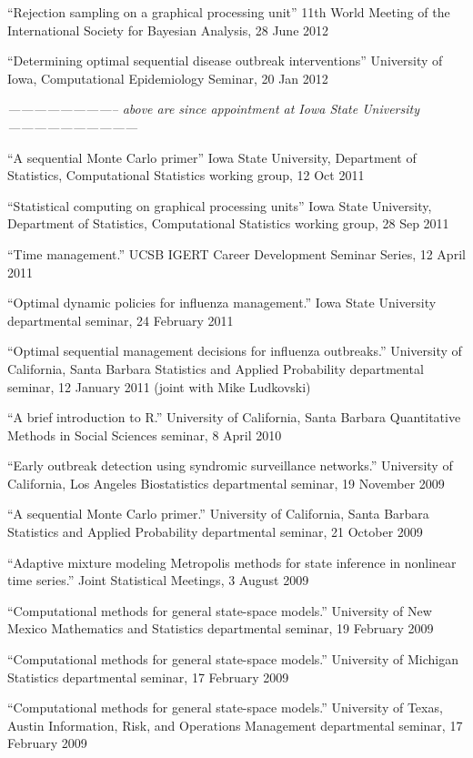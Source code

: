 \documentclass[overlapped,line]{res}
\newcommand{\sinceappt}{\emph{-------------------------- above are since appointment at Iowa State University ------------------------------}}
\newcommand{\sinceappt}{}
\begin{document}
\begin{resume}
{``Rejection sampling on a graphical processing unit'' 11th World Meeting of the International Society for Bayesian Analysis, 28 June 2012 

``Determining optimal sequential disease outbreak interventions'' University of Iowa, Computational Epidemiology Seminar, 20 Jan 2012 

\sinceappt

``A sequential Monte Carlo primer'' Iowa State University, Department of Statistics, Computational Statistics working group, 12 Oct 2011 

``Statistical computing on graphical processing units'' Iowa State University, Department of Statistics, Computational Statistics working group, 28 Sep 2011 

``Time management.'' UCSB IGERT Career Development Seminar Series, 12 April 2011 

``Optimal dynamic policies for influenza management.'' Iowa State University departmental seminar, 24 February 2011 

``Optimal sequential management decisions for influenza outbreaks.'' University of California, Santa Barbara Statistics and Applied Probability departmental seminar, 12 January 2011 (joint with Mike Ludkovski)

``A brief introduction to R.'' University of California, Santa Barbara Quantitative Methods in Social Sciences seminar, 8 April 2010 

``Early outbreak detection using syndromic surveillance networks.'' University of California, Los Angeles Biostatistics departmental seminar, 19 November 2009 

``A sequential Monte Carlo primer.'' University of California, Santa Barbara Statistics and Applied Probability departmental seminar, 21 October 2009 

``Adaptive mixture modeling Metropolis methods for state inference in nonlinear time series.'' Joint Statistical Meetings, 3 August 2009 


``Computational methods for general state-space models.'' University of New Mexico Mathematics and Statistics departmental seminar, 19 February 2009 

``Computational methods for general state-space models.'' University of Michigan Statistics departmental seminar, 17 February 2009 

``Computational methods for general state-space models.'' University of Texas, Austin Information, Risk, and Operations Management departmental seminar, 17 February 2009 

}
\end{resume}
\end{document}
